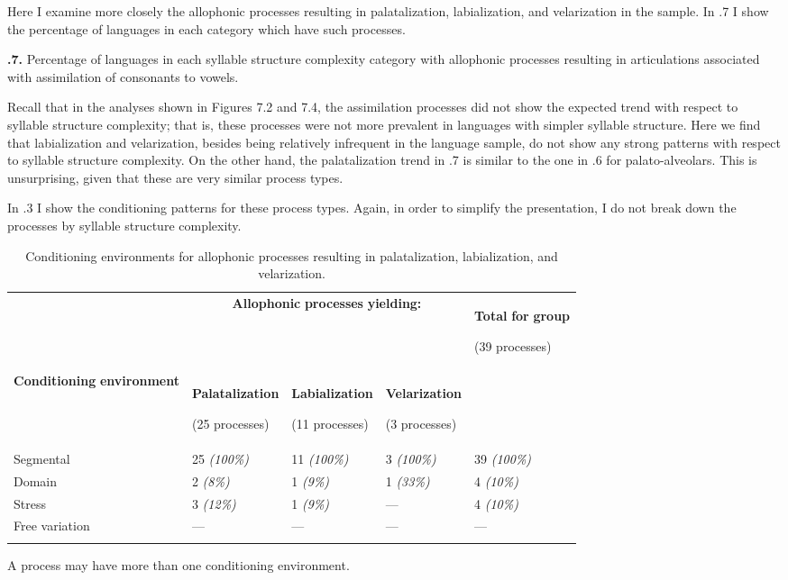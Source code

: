   Here I examine more closely the allophonic processes resulting in palatalization, labialization, and velarization in the sample. In .7 I show the percentage of languages in each category which have such processes.

\textbf{.7.} Percentage of languages in each syllable structure complexity category with allophonic processes resulting in articulations associated with assimilation of consonants to vowels.

  Recall that in the analyses shown in Figures 7.2 and 7.4, the assimilation processes did not show the expected trend with respect to syllable structure complexity; that is, these processes were not more prevalent in languages with simpler syllable structure. Here we find that labialization and velarization, besides being relatively infrequent in the language sample, do not show any strong patterns with respect to syllable structure complexity. On the other hand, the palatalization trend in .7 is similar to the one in .6 for palato-alveolars. This is unsurprising, given that these are very similar process types.

  In .3 I show the conditioning patterns for these process types. Again, in order to simplify the presentation, I do not break down the processes by syllable structure complexity.

\begin{table}
\begin{tabularx}{\textwidth}{XXXXX}
\lsptoprule
 & \multicolumn{3}{c}{ \textbf{Allophonic} \textbf{processes} \textbf{yielding:}} & { \textbf{Total} \textbf{for} \textbf{group}}

 (39 processes)\\
 \textbf{Conditioning} \textbf{environment} & { \textbf{Palatalization}}

 (25 processes) & { \textbf{Labialization}}

 (11 processes) & { \textbf{Velarization}}

 (3 processes) & \\
 Segmental & 25 \textit{(100\%)} & 11 \textit{(100\%)} & 3 \textit{(100\%)} & 39 \textit{(100\%)}\\
 Domain & 2 \textit{(8\%)} & 1 \textit{(9\%)} & 1 \textit{(33\%)} & 4 \textit{(10\%)}\\
 Stress & 3 \textit{(12\%)} & 1 \textit{(9\%)} & — & 4 \textit{(10\%)}\\
 Free variation & — & — & — & —\\
\lspbottomrule
\end{tabularx}
\caption{\label{7.3}Conditioning environments for allophonic processes resulting in palatalization, labialization, and velarization.}A process may have more than one conditioning environment.
\end{table}

